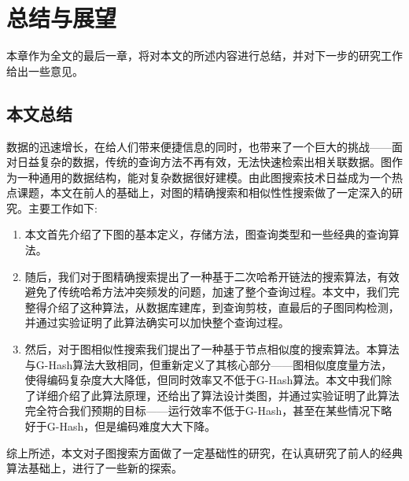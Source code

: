 \documentclass{XDBAthesis}
\begin{document}
\else
\fi
\chapter{总结与展望}
\label{chap:future}
本章作为全文的最后一章，将对本文的所述内容进行总结，并对下一步的研究工作给出一些意见。
\section{本文总结}
数据的迅速增长，在给人们带来便捷信息的同时，也带来了一个巨大的挑战——面对日益复杂的数据，传统的查询方法不再有效，无法快速检索出相关联数据。图作为一种通用的数据结构，能对复杂数据很好建模。由此图搜索技术日益成为一个热点课题，本文在前人的基础上，对图的精确搜索和相似性性搜索做了一定深入的研究。主要工作如下:
\begin{enumerate}
    \item 本文首先介绍了下图的基本定义，存储方法，图查询类型和一些经典的查询算法。
    \item 随后，我们对于图精确搜索提出了一种基于二次哈希开链法的搜索算法，有效避免了传统哈希方法冲突频发的问题，加速了整个查询过程。本文中，我们完整得介绍了这种算法，从数据库建库，到查询剪枝，直最后的子图同构检测，并通过实验证明了此算法确实可以加快整个查询过程。
    \item 然后，对于图相似性搜索我们提出了一种基于节点相似度的搜索算法。本算法与G-Hash算法大致相同，但重新定义了其核心部分——图相似度度量方法，使得编码复杂度大大降低，但同时效率又不低于G-Hash算法。本文中我们除了详细介绍了此算法原理，还给出了算法设计类图，并通过实验证明了此算法完全符合我们预期的目标——运行效率不低于G-Hash，甚至在某些情况下略好于G-Hash，但是编码难度大大下降。
\end{enumerate}

综上所述，本文对子图搜索方面做了一定基础性的研究，在认真研究了前人的经典算法基础上，进行了一些新的探索。
\end{document}
